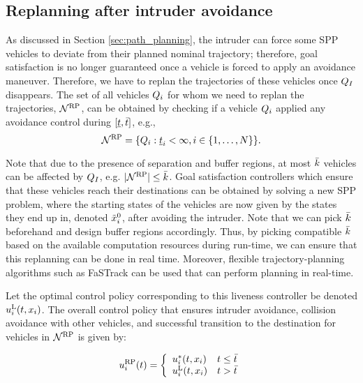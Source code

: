 \subsection{Replanning after intruder avoidance} \label{sec:replan}
As discussed in Section \ref{sec:path_planning}, the intruder can force some SPP vehicles to deviate from their planned nominal trajectory; therefore, goal satisfaction is no longer guaranteed once a vehicle is forced to apply an avoidance maneuver. Therefore, we have to replan the trajectories of these vehicles once $Q_{I}$ disappears. The set of all vehicles $Q_i$ for whom we need to replan the trajectories, $\mathcal{N}^\text{RP}$, can be obtained by checking if a vehicle $Q_i$ applied any avoidance control during $[\underline{t}, \bar{t}]$, e.g.,
\begin{equation} \label{eq:RVS}
\rvs = \{\veh_i: \tsa_i < \infty, i \in \{1, \ldots, \N \} \}. 
\end{equation}  

Note that due to the presence of separation and buffer regions, at most $\bar{k}$ vehicles can be affected by $Q_{I}$, e.g. $|\mathcal{N}^\text{RP}| \leq \bar{k}$. Goal satisfaction controllers which ensure that these vehicles reach their destinations can be obtained by solving a new SPP problem, where the starting states of the vehicles are now given by the states they end up in, denoted $\tilde{x}_i^0$, after avoiding the intruder. Note that we can pick $\bar{k}$ beforehand and design buffer regions accordingly. Thus, by picking compatible $\bar{k}$ based on the available computation resources during run-time, we can ensure that this replanning can be done in real time. Moreover, flexible trajectory-planning algorithms such as FaSTrack \cite{herbert2017fastrack} can be used that can perform planning in real-time.   

Let the optimal control policy corresponding to this liveness controller be denoted ${u^{\text{L}}_{i}}(t, x_i)$. The overall control policy that ensures intruder avoidance, collision avoidance with other vehicles, and successful transition to the destination for vehicles in $\mathcal{N}^\text{RP}$ is given by:

\begin{equation} \label{eqn:full_controller}
\ctrl_i^{\text{RP}}(t) = 
\left \{ 
\begin{array}{ll}
{\ctrl^*_{i}}(t, \state_i) & t \leq \tea\\
{\ctrl^{\text{L}}_{i}}(t, \state_i) & t > \tea
\end{array}
\right.
\end{equation}

